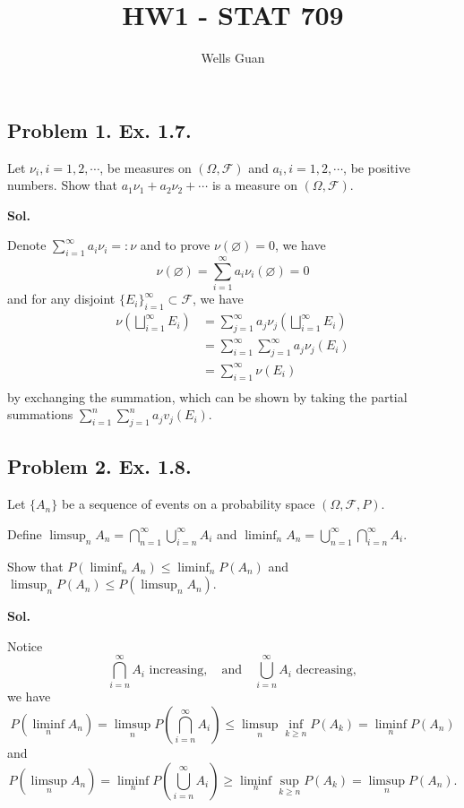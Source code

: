 \documentclass[lang=en,11pt,a4paper,citestyle =authoryear]{elegantpaper}
\title{HW1 - STAT 709}
\author{Wells Guan}
\begin{document}
\maketitle

\noindent

\subsection*{Problem 1. Ex. 1.7. } 

 Let $\nu_i, i = 1, 2, \cdots$, be measures on $(\Omega, \mathcal{F})$ and $a_i, i = 1, 2, \cdots$, be
positive numbers. Show that $a_1\nu_1 +a_2\nu_2 + \cdots$ is a measure on $(\Omega, \mathcal{F})$.\par
\vspace{0.5em}
\textbf{Sol.} \par
Denote $\sum\limits_{i=1}^{\infty}a_i\nu_i =: \nu$ and to prove $\nu(\varnothing) = 0$, we have
\[
\nu(\varnothing) = \sum\limits_{i=1}^{\infty}a_i\nu_i(\varnothing) = 0
\]
and for any disjoint $\{E_i\}_{i=1}^{\infty}\subset\mathcal{F}$, we have
\[
\begin{aligned}
    \nu\left(\bigsqcup_{i=1}^{\infty}E_i\right) &=\sum\limits_{j=1}^{\infty}a_j\nu_j\left(\bigsqcup_{i=1}^{\infty}E_i\right)\\
    &= \sum\limits_{i=1}^{\infty}\sum\limits_{j=1}^{\infty} a_j\nu_j(E_i)\\
    & = \sum\limits_{i=1}^{\infty} \nu(E_i)\\
\end{aligned}
\]
by exchanging the summation, which can be shown by taking the partial summations $\sum\limits_{i=1}^n \sum\limits_{j=1}^n a_jv_j(E_i)$.
\vspace{0.5em}


\subsection*{Problem 2. Ex. 1.8. } 
Let $\{A_n\}$ be a sequence of events on a probability space $(\Omega, \mathcal{F}, P)$.\par
Define $\limsup_n A_n = \bigcap_{n=1}^{\infty}\bigcup_{i=n}^{\infty} A_i$ and $\liminf_n A_n = \bigcup_{n=1}^{\infty}\bigcap_{i=n}^{\infty} A_i$.\par
Show that $P(\liminf_n A_n) \leq \liminf_n P(A_n)$ and $\limsup_n P(A_n) \leq
P(\limsup_n A_n)$.\par
\vspace{0.5em}
\textbf{Sol.} \par
Notice
\[
\bigcap_{i=n}^{\infty} A_i\text{ increasing},\quad \text{and}\quad\bigcup_{i=n}^{\infty} A_i\text{ decreasing},
\]
we have
\[
P\left(\liminf_n A_n\right) = \limsup_n P\left(\bigcap_{i=n}^{\infty}A_i\right) \leq \limsup_n \inf_{k\geq n}P(A_k) = \liminf_n P(A_n) 
\]
and
\[
P\left(\limsup_n A_n\right) = \liminf_n P\left(\bigcup_{i=n}^{\infty}A_i\right) \geq \liminf_n \sup_{k\geq n}P(A_k) = \limsup_n P(A_n).
\]
\vspace{0.5em}
\end{document}

